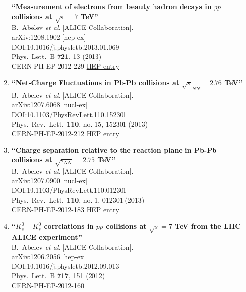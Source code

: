 \begin{enumerate}
{\bf ``Measurement of electrons from beauty hadron decays in $pp$ collisions at $\sqrt{s}=7$ TeV''}
  \\{}B.~Abelev {\it et al.} [ALICE Collaboration].
  \\{}arXiv:1208.1902 [hep-ex]
  \\{}DOI:10.1016/j.physletb.2013.01.069
  \\{}Phys.\ Lett.\ B {\bf 721}, 13 (2013)
  \\{}CERN-PH-EP-2012-229
\href{http://inspirehep.net/record/1126962}{HEP entry}
\item%
{\bf ``Net-Charge Fluctuations in Pb-Pb collisions at $\sqrt{s}_{NN} = 2.76$ TeV''}
  \\{}B.~Abelev {\it et al.} [ALICE Collaboration].
  \\{}arXiv:1207.6068 [nucl-ex]
  \\{}DOI:10.1103/PhysRevLett.110.152301
  \\{}Phys.\ Rev.\ Lett.\  {\bf 110}, no. 15, 152301 (2013)
  \\{}CERN-PH-EP-2012-212
\href{http://inspirehep.net/record/1123802}{HEP entry}
\item%
{\bf ``Charge separation relative to the reaction plane in Pb-Pb collisions at $\sqrt{s_{NN}}= 2.76$ TeV''}
  \\{}B.~Abelev {\it et al.} [ALICE Collaboration].
  \\{}arXiv:1207.0900 [nucl-ex]
  \\{}DOI:10.1103/PhysRevLett.110.012301
  \\{}Phys.\ Rev.\ Lett.\  {\bf 110}, no. 1, 012301 (2013)
  \\{}CERN-PH-EP-2012-183
\href{http://inspirehep.net/record/1121161}{HEP entry}
\item%
{\bf ``$K^0_s-K^0_s$ correlations in $pp$ collisions at $\sqrt{s}=7$ TeV from the LHC ALICE experiment''}
  \\{}B.~Abelev {\it et al.} [ALICE Collaboration].
  \\{}arXiv:1206.2056 [hep-ex]
  \\{}DOI:10.1016/j.physletb.2012.09.013
  \\{}Phys.\ Lett.\ B {\bf 717}, 151 (2012)
  \\{}CERN-PH-EP-2012-160

\end{enumerate}

